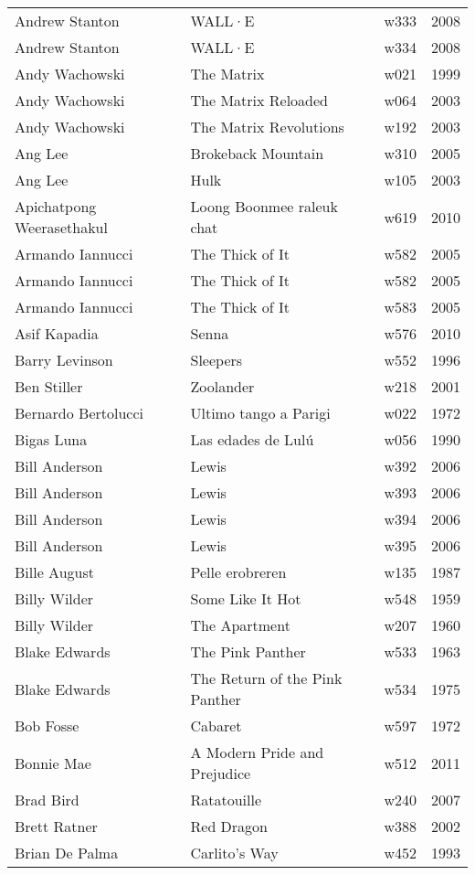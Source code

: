 \documentclass{article}
\begin{document}
\begin {center}
\begin{longtable}{l p{10cm} l l}
Andrew Stanton & WALL·E & w333 & 2008 \\
Andrew Stanton & WALL·E & w334 & 2008 \\
Andy Wachowski & The Matrix & w021 & 1999 \\
Andy Wachowski & The Matrix Reloaded & w064 & 2003 \\
Andy Wachowski & The Matrix Revolutions & w192 & 2003 \\
Ang Lee & Brokeback Mountain & w310 & 2005 \\
Ang Lee & Hulk & w105 & 2003 \\
Apichatpong Weerasethakul & Loong Boonmee raleuk chat & w619 & 2010 \\
Armando Iannucci & The Thick of It & w582 & 2005 \\
Armando Iannucci & The Thick of It & w582 & 2005 \\
Armando Iannucci & The Thick of It & w583 & 2005 \\
Asif Kapadia & Senna & w576 & 2010 \\
Barry Levinson & Sleepers & w552 & 1996 \\
Ben Stiller & Zoolander & w218 & 2001 \\
Bernardo Bertolucci & Ultimo tango a Parigi & w022 & 1972 \\
Bigas Luna & Las edades de Lulú & w056 & 1990 \\
Bill Anderson & Lewis & w392 & 2006 \\
Bill Anderson & Lewis & w393 & 2006 \\
Bill Anderson & Lewis & w394 & 2006 \\
Bill Anderson & Lewis & w395 & 2006 \\
Bille August & Pelle erobreren & w135 & 1987 \\
Billy Wilder & Some Like It Hot & w548 & 1959 \\
Billy Wilder & The Apartment & w207 & 1960 \\
Blake Edwards & The Pink Panther & w533 & 1963 \\
Blake Edwards & The Return of the Pink Panther & w534 & 1975 \\
Bob Fosse & Cabaret & w597 & 1972 \\
Bonnie Mae & A Modern Pride and Prejudice & w512 & 2011 \\
Brad Bird & Ratatouille & w240 & 2007 \\
Brett Ratner & Red Dragon & w388 & 2002 \\
Brian De Palma & Carlito's Way & w452 & 1993 \\

\end{longtable}
\end{center}
\end{document}
